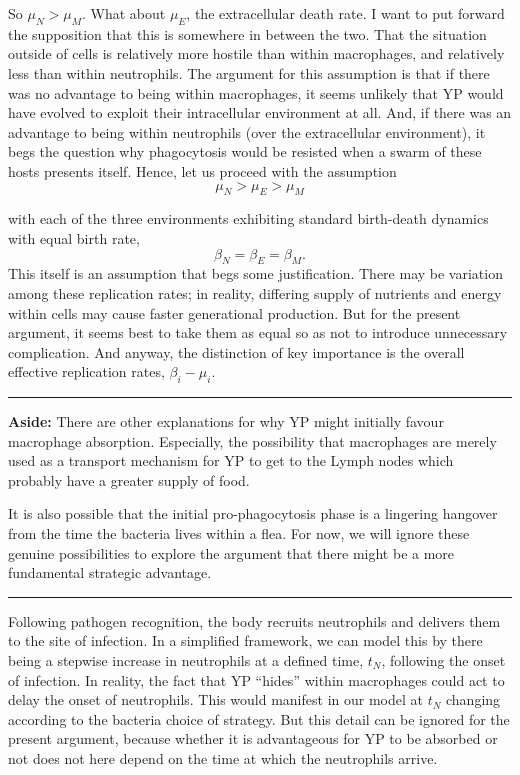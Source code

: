 So $\mu_N > \mu_M$. What about $\mu_E$, the extracellular death rate. I want to put forward the supposition that this is somewhere in between the two. That the situation outside of cells is relatively more hostile than within macrophages, and relatively less than within neutrophils. 
The argument for this assumption is that if there was no advantage to being within macrophages, it seems unlikely that YP would have evolved to exploit their intracellular environment at all. And, if there was an advantage to being within neutrophils (over the extracellular environment), it begs the question why phagocytosis would
 be resisted when a swarm of these hosts presents itself. Hence, let us proceed with the assumption 
$$\mu_N > \mu_E > \mu_M$$

with each of the three environments exhibiting standard birth-death dynamics with equal birth rate,
$$\beta_N = \beta _E = \beta_M.$$
This itself is an assumption that begs some justification. There may be variation among these replication rates; in reality, differing supply of nutrients and energy within cells may cause faster generational production. But for the present argument, it seems best to take them as equal so as not to introduce unnecessary complication. And anyway, the distinction of key importance is the overall effective replication rates, $\beta_i - \mu_i$. 


\vspace{10pt}
\hrule
\vspace{10pt}

\noindent
\textbf{Aside:}  There are other explanations for why YP might initially favour macrophage absorption. Especially, the possibility that macrophages are merely used as a transport mechanism for YP to get to the Lymph nodes which probably have a greater supply of food.\par
It is also possible that the initial pro-phagocytosis phase is a lingering hangover from the time the bacteria lives within a flea. 
For now, we will ignore these genuine possibilities to explore the argument that there might be a more fundamental strategic advantage. 

\vspace{10pt}
\hrule
\vspace{10pt}

\noindent
Following pathogen recognition, the body recruits neutrophils and delivers them to the site of infection. In a simplified framework, we can model this by there being a stepwise increase in neutrophils at a defined time, $t_N$, following the onset of infection. In reality, the fact that YP ``hides'' within macrophages could act to delay the onset of neutrophils. This would manifest in our model at $t_N$ changing according to the bacteria choice of strategy. But this detail can be ignored for the present argument, because whether it is advantageous for YP to be absorbed or not does not here depend on the time at which the neutrophils arrive. 



